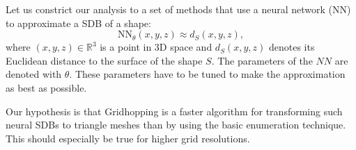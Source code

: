 \documentclass[11pt,twocolumn]{article}
\begin{document}
		Let us constrict our analysis to a set of methods that use a neural network (NN) to approximate a SDB of a shape:
		\begin{equation}\label{eq:nnsdb}
			\text{NN}_\theta(x, y, z)\approx
			d_S(x, y, z)
			,
		\end{equation}
		where $(x, y, z)\in\mathbb{R}^3$ is a point in 3D space and $d_S(x, y, z)$ denotes its Euclidean distance to the surface of the shape $S$.
		The parameters of the $NN$ are denoted with $\theta$.
		These parameters have to be tuned to make the approximation as best as possible.

		Our hypothesis is that Gridhopping is a faster algorithm for transforming such neural SDBs to triangle meshes than by using the basic enumeration technique.
		This should especially be true for higher grid resolutions.
\end{document}
